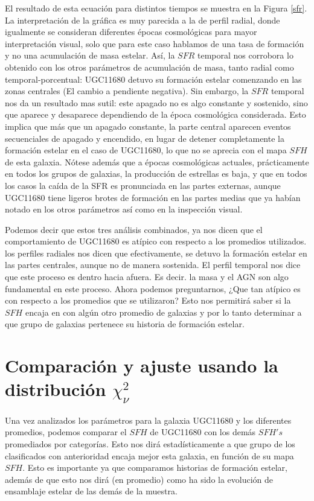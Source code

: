 \noindent El resultado de esta ecuación para distintos tiempos se muestra en la Figura \ref{sfr}. La interpretación de la gráfica es muy parecida a la de perfil radial, donde igualmente se consideran diferentes épocas cosmológicas para mayor interpretación visual, solo que para este caso hablamos de una tasa de formación y no una acumulación de masa estelar. Así, la $SFR$ temporal nos corrobora lo obtenido con los otros parámetros de acumulación de masa, tanto radial como temporal-porcentual: UGC11680 detuvo su formación estelar comenzando en las zonas centrales (El cambio a pendiente negativa). Sin embargo, la $SFR$ temporal nos da un resultado mas sutil: este apagado no es algo constante y sostenido, sino que aparece y desaparece dependiendo de la época cosmológica considerada. Esto implica que más que un apagado constante, la parte central aparecen eventos secuenciales de apagado y encendido, en lugar de detener completamente la formación estelar en el caso de UGC11680, lo que no se aprecia con el mapa $SFH$ de esta galaxia. Nótese además que a épocas cosmológicas actuales, prácticamente en todos los grupos de galaxias, la producción de estrellas es baja, y que en todos los casos la caída de la SFR es pronunciada en las partes externas, aunque UGC11680 tiene ligeros brotes de formación en las partes medias que ya habían notado en los otros parámetros así como en la inspección visual.

\bigskip

\noindent Podemos decir que estos tres análisis combinados, ya nos dicen que el comportamiento de UGC11680 es atípico con respecto a los promedios utilizados. los perfiles radiales nos dicen que efectivamente, se detuvo la formación estelar en las partes centrales, aunque no de manera sostenida. El perfil temporal nos dice que este proceso es dentro hacia afuera. Es decir. la masa y el AGN son algo fundamental en este proceso. Ahora podemos preguntarnos, ¿Que tan atípico es con respecto a los promedios que se utilizaron? Esto nos permitirá saber si la $SFH$ encaja en con algún otro promedio de galaxias y por lo tanto determinar a que grupo de galaxias pertenece su historia de formación estelar.




\section{Comparación y ajuste usando la distribución $\chi^{2}_{\nu}$}

Una vez analizados los parámetros para la galaxia UGC11680 y los diferentes promedios, podemos
comparar el $SFH$ de  UGC11680  con los demás $SFH's$ promediados por categorías. Esto nos dirá estadísticamente a que grupo de los clasificados con anterioridad encaja mejor esta galaxia, en función de su mapa $SFH$. Esto es importante ya que comparamos historias de formación estelar, además de que esto nos dirá (en promedio) como ha sido la evolución de ensamblaje estelar de las demás de la muestra.

